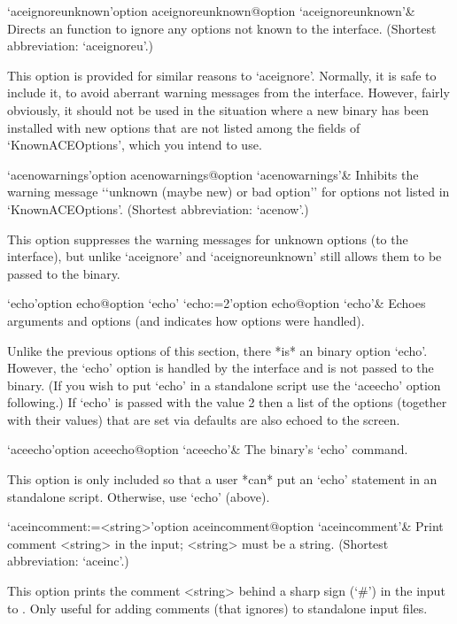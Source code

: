 \>`aceignoreunknown'{option aceignoreunknown}@{option `aceignoreunknown'}&
Directs an {\ACE} function to  ignore  any  options  not known to the
{\ACE} interface.
(Shortest abbreviation: `aceignoreu'.)

This option is provided for similar reasons to `aceignore'.  Normally,
it is safe to include it, to avoid aberrant warning messages from  the
{\ACE} interface. However, fairly obviously, it should not be used  in
the situation where a new {\ACE} binary has been  installed  with  new
options that are not listed among  the  fields  of  `KnownACEOptions',
which you intend to use.

\>`acenowarnings'{option acenowarnings}@{option `acenowarnings'}& 
Inhibits the warning message \lq{}`unknown (maybe new) or bad option''
for options not listed in `KnownACEOptions'.
(Shortest abbreviation: `acenow'.)

This option suppresses the warning messages for  unknown  options  (to
the {\ACE} interface), but unlike `aceignore'  and  `aceignoreunknown'
still allows them to be passed to the {\ACE} binary.

\>`echo'{option echo}@{option `echo'} 
\>`echo:=2'{option echo}@{option `echo'}& 
Echoes arguments and options (and indicates how options were handled).

Unlike the previous options of this  section,  there  *is*  an  {\ACE}
binary option `echo'. However, the `echo' option  is  handled  by  the
{\ACE} interface and is not passed to the {\ACE} binary. (If you  wish
to put  `echo'  in  a  standalone  script  use  the  `aceecho'  option
following.) If `echo' is passed with the value 2 then a  list  of  the
options (together with their values) that are set via {\ACE}  defaults
are also echoed to the screen.

\>`aceecho'{option aceecho}@{option `aceecho'}& 
The {\ACE} binary's `echo' command.

This option is only included so  that  a  user  *can*  put  an  `echo'
statement in  an  {\ACE}  standalone  script.  Otherwise,  use  `echo'
(above).

\>`aceincomment:=<string>'{option aceincomment}@{option `aceincomment'}&
Print comment <string> in the {\ACE} input; <string> must be a string.
(Shortest abbreviation: `aceinc'.)

This option prints the comment <string> behind a sharp sign (`\#')  in
the input to {\ACE}. Only useful  for  adding  comments  (that  {\ACE}
ignores) to standalone input files.

